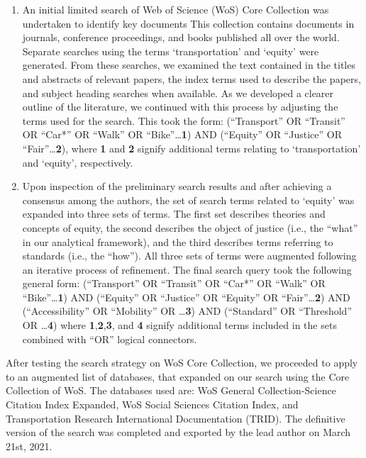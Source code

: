 \documentclass[12pt, oneside]{report}
\begin{document}
\begin{enumerate}
\def\labelenumi{\arabic{enumi}.}
\item
  An initial limited search of Web of Science (WoS) Core Collection was
  undertaken to identify key documents This collection contains
  documents in journals, conference proceedings, and books published all
  over the world. Separate searches using the terms `transportation' and
  `equity' were generated. From these searches, we examined the text
  contained in the titles and abstracts of relevant papers, the index
  terms used to describe the papers, and subject heading searches when
  available. As we developed a clearer outline of the literature, we
  continued with this process by adjusting the terms used for the
  search. This took the form: (``Transport'' OR ``Transit'' OR ``Car*''
  OR ``Walk'' OR ``Bike''\ldots{}\textbf{1}) AND (``Equity'' OR
  ``Justice'' OR ``Fair''\ldots{}\textbf{2}), where \textbf{1} and
  \textbf{2} signify additional terms relating to `transportation' and
  `equity', respectively.
\item
  Upon inspection of the preliminary search results and after achieving
  a consensus among the authors, the set of search terms related to
  `equity' was expanded into three sets of terms. The first set
  describes theories and concepts of equity, the second describes the
  object of justice (i.e., the ``what'' in our analytical framework),
  and the third describes terms referring to standards (i.e., the
  ``how''). All three sets of terms were augmented following an
  iterative process of refinement. The final search query took the
  following general form: (``Transport'' OR ``Transit'' OR ``Car*'' OR
  ``Walk'' OR ``Bike''\ldots{}\textbf{1}) AND (``Equity'' OR ``Justice''
  OR ``Equity'' OR ``Fair''\ldots{}\textbf{2}) AND (``Accessibility'' OR
  ``Mobility'' OR \ldots{}\textbf{3}) AND (``Standard'' OR ``Threshold''
  OR \ldots{}\textbf{4}) where \textbf{1},\textbf{2},\textbf{3}, and
  \textbf{4} signify additional terms included in the sets combined with
  ``OR'' logical connectors.
\end{enumerate}

After testing the search strategy on WoS Core Collection, we proceeded
to apply to an augmented list of databases, that expanded on our search
using the Core Collection of WoS. The databases used are: WoS General
Collection-Science Citation Index Expanded, WoS Social Sciences Citation
Index, and Transportation Research International Documentation (TRID).
The definitive version of the search was completed and exported by the
lead author on March 21st, 2021.
\end{document}
